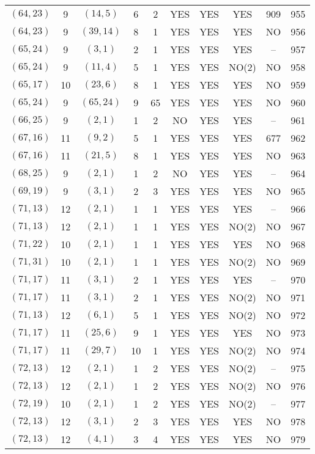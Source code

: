 \begin{longtable}{|c|c|c|c|c|c|c|c|c|c|}
$(64, 23)$ & 9 & $(14, 5)$ & 6 & 2 & YES & YES & YES & 909 & 955\\
$(64, 23)$ & 9 & $(39, 14)$ & 8 & 1 & YES & YES & YES & NO & 956\\
$(65, 24)$ & 9 & $(3, 1)$ & 2 & 1 & YES & YES & YES & -- & 957\\
$(65, 24)$ & 9 & $(11, 4)$ & 5 & 1 & YES & YES & NO(2) & NO & 958\\
$(65, 17)$ & 10 & $(23, 6)$ & 8 & 1 & YES & YES & YES & NO & 959\\
$(65, 24)$ & 9 & $(65, 24)$ & 9 & 65 & YES & YES & YES & NO & 960\\
$(66, 25)$ & 9 & $(2, 1)$ & 1 & 2 & NO & YES & YES & -- & 961\\
$(67, 16)$ & 11 & $(9, 2)$ & 5 & 1 & YES & YES & YES & 677 & 962\\
$(67, 16)$ & 11 & $(21, 5)$ & 8 & 1 & YES & YES & YES & NO & 963\\
$(68, 25)$ & 9 & $(2, 1)$ & 1 & 2 & NO & YES & YES & -- & 964\\
$(69, 19)$ & 9 & $(3, 1)$ & 2 & 3 & YES & YES & YES & NO & 965\\
$(71, 13)$ & 12 & $(2, 1)$ & 1 & 1 & YES & YES & YES & -- & 966\\
$(71, 13)$ & 12 & $(2, 1)$ & 1 & 1 & YES & YES & NO(2) & NO & 967\\
$(71, 22)$ & 10 & $(2, 1)$ & 1 & 1 & YES & YES & YES & NO & 968\\
$(71, 31)$ & 10 & $(2, 1)$ & 1 & 1 & YES & YES & NO(2) & NO & 969\\
$(71, 17)$ & 11 & $(3, 1)$ & 2 & 1 & YES & YES & YES & -- & 970\\
$(71, 17)$ & 11 & $(3, 1)$ & 2 & 1 & YES & YES & NO(2) & NO & 971\\
$(71, 13)$ & 12 & $(6, 1)$ & 5 & 1 & YES & YES & NO(2) & NO & 972\\
$(71, 17)$ & 11 & $(25, 6)$ & 9 & 1 & YES & YES & YES & NO & 973\\
$(71, 17)$ & 11 & $(29, 7)$ & 10 & 1 & YES & YES & NO(2) & NO & 974\\
$(72, 13)$ & 12 & $(2, 1)$ & 1 & 2 & YES & YES & NO(2) & -- & 975\\
$(72, 13)$ & 12 & $(2, 1)$ & 1 & 2 & YES & YES & NO(2) & NO & 976\\
$(72, 19)$ & 10 & $(2, 1)$ & 1 & 2 & YES & YES & NO(2) & -- & 977\\
$(72, 13)$ & 12 & $(3, 1)$ & 2 & 3 & YES & YES & YES & NO & 978\\
$(72, 13)$ & 12 & $(4, 1)$ & 3 & 4 & YES & YES & YES & NO & 979\\

\end{longtable}

